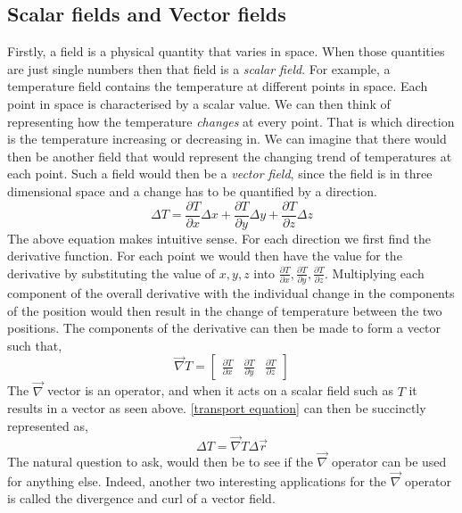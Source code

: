 \subsection{Scalar fields and Vector fields} 
Firstly, a field is a physical quantity that varies in space. When those quantities are just single numbers then that field is a \emph{scalar field}. For example, a temperature field contains the temperature at different points in space. Each point in space is characterised by a scalar value. We can then think of representing how the temperature \emph{changes} at every point. That is which direction is the temperature increasing or decreasing in. We can imagine that there would then be another field that would represent the changing trend of temperatures at each point. Such a field would then be a \emph{vector field}, since the field is in three dimensional space and a change has to be quantified by a direction.
\begin{equation}
	\label{transport equation}
	\Delta T = \frac{\partial T}{\partial x}\Delta x +  \frac{\partial T}{\partial y}\Delta y + \frac{\partial T}{\partial z}\Delta z
\end{equation}
The above equation makes intuitive sense. For each direction we first find the derivative function. For each point we would then have the value for the derivative by substituting the value of $x,y, z$ into $\frac{\partial T}{\partial x}, \frac{\partial T}{\partial y}, \frac{\partial T}{\partial z}$. Multiplying each component of the overall derivative with the individual change in the components of the position would then result in the change of temperature between the two positions. The components of the derivative can then be made to form a vector such that, 
\begin{equation}
	  \vec{\nabla}T = 
	  \begin{bmatrix} 
	  	\frac{\partial T}{\partial x} & \frac{\partial T}{\partial y} & \frac{\partial T}{\partial z}
	  \end{bmatrix}
\end{equation}
The $\vec{\nabla}$ vector is an operator, and when it acts on a scalar field such as $T$ it results in a vector as seen above. \autoref{transport equation} can then be succinctly represented as, 
\begin{equation}
	\Delta T = \vec{\nabla} T \Delta \vec{r}
\end{equation}
The natural question to ask, would then be to see if the $\vec{\nabla}$ operator can be used for anything else. Indeed, another two interesting applications for the $\vec{\nabla}$ operator is called the divergence and curl of a vector field.\\

